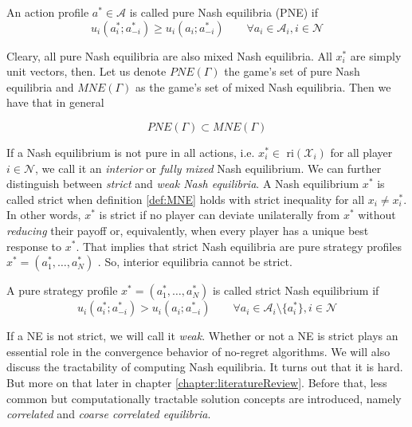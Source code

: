 \begin{definition}\label{def:PNE}
    An action profile $a^* \in \mathcal{A}$ is called pure Nash equilibria (PNE) if
    \[u_i(a_{i}^{*};a_{-i}^{*}) \ge u_i(a_{i};a_{-i}^{*}) \qquad \forall a_i \in \mathcal{A}_i, i \in \mathcal{N}\]
\end{definition}

Cleary, all pure Nash equilibria are also mixed Nash equilibria. All $x_{i}^{*}$ are simply unit vectors, then. Let us denote $PNE(\Gamma)$ the game's set of pure Nash equilibria and $MNE(\Gamma)$ as the game's set of mixed Nash equilibria. Then we have that in general

\begin{equation*}
    PNE(\Gamma) \subset MNE(\Gamma)
\end{equation*}

If a Nash equilibrium is not pure in all actions, i.e. $x_i^* \in$ ri$(\mathcal{X}_i)$ for all player $i \in \mathcal{N}$,  we call it an \textit{interior} or \textit{fully mixed} Nash equilibrium. We can further distinguish between \textit{strict} and \textit{weak Nash equilibria}. A Nash equilibrium $x^*$ is called strict when definition \ref{def:MNE} holds with strict inequality for all $x_i \neq x_{i}^{*}$. In other words, $x^*$ is strict if no player can deviate unilaterally from $x^*$ without \textit{reducing} their payoff or, equivalently, when every player has a unique best response to $x^*$. That implies that strict Nash equilibria are pure strategy profiles $x^* = (a_{1}^{*},\dots,a_{N}^{*})$ \cite{HDRmertikopoulos}. So, interior equilibria cannot be strict.

\begin{definition}\label{def:strictNE}
    A pure strategy profile $x^* = (a_{1}^{*},\dots,a_{N}^{*})$ is called strict Nash equilibrium if
    \[u_i(a_{i}^{*};a_{-i}^{*}) > u_i(a_{i};a_{-i}^{*}) \qquad \forall a_i \in \mathcal{A}_i \setminus \{a_{i}^{*}\} , i \in \mathcal{N}\]
\end{definition}

If a NE is not strict, we will call it \textit{weak}. Whether or not a NE is strict plays an essential role in the convergence behavior of no-regret algorithms. We will also discuss the tractability of computing Nash equilibria. It turns out that it is hard. But more on that later in chapter \ref{chapter:literatureReview}. Before that, less common but computationally tractable solution concepts are introduced, namely \textit{correlated} and \textit{coarse correlated equilibria}.

